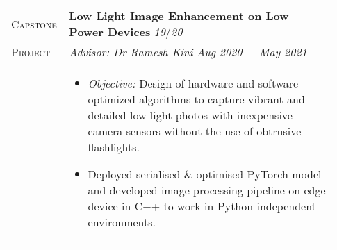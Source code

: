 \documentclass[letterpaper, 10pt, oneside]{article}
\newcommand{\stitle}[1]{\normalsize{\textsc{#1}}}
\newcommand{\bdit}[1]{{\textbf{#1}}}
\begin{document}
\begin{longtable}{@{} p{0.13\linewidth} p{0.8\linewidth}}
    \stitle{Capstone}    & \bdit{Low Light Image Enhancement on Low Power Devices} \hfill \textsl{19}/\textsl{20}                                                                                                                            \\
    \stitle{Project}     & \textsl{Advisor: Dr Ramesh Kini} \hfill \textsl{Aug 2020\ --\ May 2021}                                                                                                                                           \\
                         & \parbox{0.8\textwidth}{                                                                                                                                                                                           %
        \begin{itemize}[leftmargin=*, itemsep=-0.70ex, topsep=-0.88ex]
            \item \textsl{Objective:} Design of hardware and software-optimized algorithms to capture vibrant and detailed low-light photos with inexpensive camera sensors without the use of obtrusive flashlights.
            \item Deployed serialised \& optimised PyTorch model and developed image processing pipeline on edge device in C++ to work in Python-independent environments.
        \end{itemize}
    }
    \\
    \\





\end{longtable}
\end{document}
